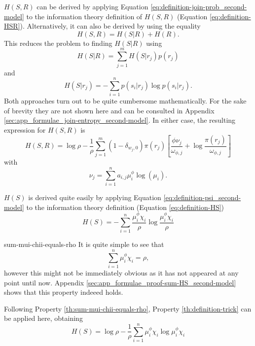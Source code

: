 $H(S,R)$ can be derived by applying Equation \eqref{eq:definition-join-prob_second-model} to the information theory definition of $H(S,R)$ (Equation \eqref{eq:definition-HSR}).
Alternatively, it can also be derived by using the equality
\begin{equation*}
  H(S,R) = H(S|R) + H(R).
\end{equation*}
This reduces the problem to finding $H(S|R)$ using
\begin{equation*}
  H(S|R) = \sum_{j=1}^m H(S|r_j)p(r_j) 
\end{equation*}
and
\begin{equation*}
  H(S|r_j) = -\sum_{i=1}^n p(s_i|r_j) \log p(s_i|r_j).
\end{equation*}
Both approaches turn out to be quite cumbersome mathematically.
For the sake of brevity they are not shown here and can be consulted in Appendix \ref{sec:app_formulae_join-entropy_second-model}.
In either case, the resulting expression for $H(S,R)$ is
\begin{equation}
  \label{eq:definition-HSR_second-model}
  H(S,R) = \log \rho - \frac{1}{\rho} \sum_{j=1}^m (1 - \delta_{w_j,0}) \pi(r_j) \left[ \frac{\phi \nu_j}{\omega_{\phi,j}} + \log \frac{\pi(r_j)}{\omega_{\phi,j}} \right]
\end{equation}
with
\begin{equation}
  \label{eq:definition-nu}
  \nu_j = \sum_{i=1}^n a_{i,j} \mu_i^\phi \log(\mu_i).
\end{equation}

$H(S)$ is derived quite easily by applying Equation \eqref{eq:definition-psi_second-model} to the information theory definition (Equation \eqref{eq:definition-HS})
\begin{equation*}
  H(S) = -\sum_{i=1}^n \frac{\mu_i^\phi \chi_i}{\rho} \log \frac{\mu_i^\phi \chi_i}{\rho}
\end{equation*}

\begin{property}{}{sum-mui-chii-equals-rho}
  It is quite simple to see that
  \begin{equation*}
    \sum_{i=1}^n \mu_i^\phi \chi_i = \rho,
  \end{equation*}
  however this might not be immediately obvious as it has not appeared at any point until now.
  Appendix \ref{sec:app_formulae_proof-sum-HS_second-model} shows that this property indeeed holds.
\end{property}

Following Property \ref{th:sum-mui-chii-equals-rho}, Property \ref{th:definition-trick} can be applied here, obtaining
\begin{equation}
  \label{eq:definition-HS_second-model}
  H(S) = \log \rho - \frac{1}{\rho} \sum_{i=1}^n \mu_i^\phi \chi_i \log \mu_i^\phi \chi_i
\end{equation}


